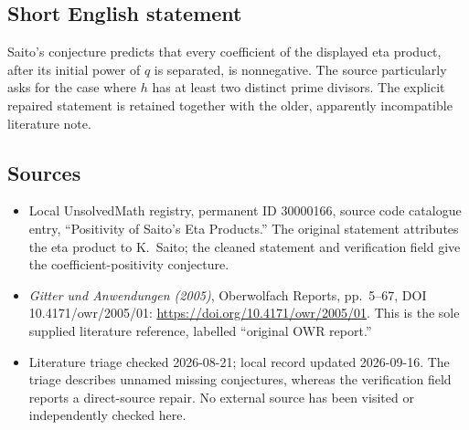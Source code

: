 \documentclass[11pt]{article}
\begin{document}
\subsection{Short English statement}
Saito's conjecture predicts that every coefficient of the displayed eta product, after its initial power of \(q\) is separated, is nonnegative. The source particularly asks for the case where \(h\) has at least two distinct prime divisors. The explicit repaired statement is retained together with the older, apparently incompatible literature note.
\subsection{Sources}
\begin{itemize}
\item Local UnsolvedMath registry, permanent ID 30000166, source code catalogue entry, ``Positivity of Saito's Eta Products.'' The original statement attributes the eta product to K.\ Saito; the cleaned statement and verification field give the coefficient-positivity conjecture.
\item \emph{Gitter und Anwendungen (2005)}, Oberwolfach Reports, pp.\ 5--67, DOI 10.4171/owr/2005/01: \url{https://doi.org/10.4171/owr/2005/01}. This is the sole supplied literature reference, labelled ``original OWR report.''
\item Literature triage checked 2026-08-21; local record updated 2026-09-16. The triage describes unnamed missing conjectures, whereas the verification field reports a direct-source repair. No external source has been visited or independently checked here.
\end{itemize}
\end{document}
